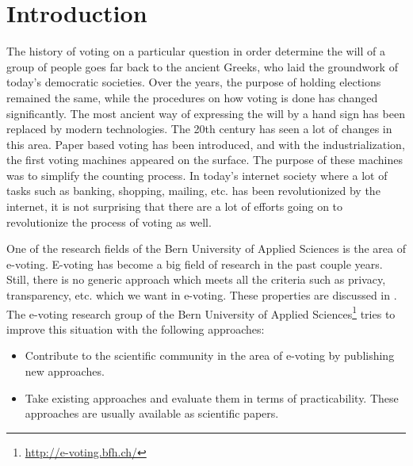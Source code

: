 \documentclass[numbers=noenddot, abstract=on, a4paper, headsepline,
footsepline, oneside, draft=off]{scrreprt}
\begin{document}



\chapter{Introduction}
\label{cha:introduction}
The history of voting on a particular question in order determine the will of a
group of people goes far back to the ancient Greeks, who laid the groundwork of
today's democratic societies. Over the years, the purpose of holding elections
remained the same, while the procedures on how voting is done has changed
significantly. The most ancient way of expressing the will by a hand sign has
been replaced by modern technologies. The 20th century has seen a lot of changes
in this area. Paper based voting has been introduced, and with the
industrialization, the first voting machines appeared on the surface. The
purpose of these machines was to simplify the counting process. In today's internet
society where a lot of tasks such as banking, shopping, mailing, etc. has been
revolutionized by the internet, it is not surprising that there are a lot of
efforts going on to revolutionize the process of voting as well.

One of the research fields of the Bern University of Applied Sciences is the
area of e-voting. E-voting has become a big field of research in the past couple
years. Still, there is no generic approach which meets all the criteria such as
privacy, transparency, etc. which we want in e-voting. These properties are
discussed in . The e-voting research group of the Bern
University of Applied Sciences\footnote{\url{http://e-voting.bfh.ch/}} tries to
improve this situation with the following approaches:
\begin{itemize}
  \item Contribute to the scientific community in the area of e-voting by
  publishing new approaches.
  \item Take existing approaches and evaluate them in terms of practicability.
  These approaches are usually available as scientific papers.
\end{itemize}
\end{document}
